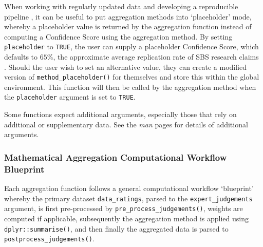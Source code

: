 \documentclass[article]{jss}
\begin{document}
\begin{tcolorbox}[enhanced jigsaw, arc=.35mm, bottomrule=.15mm, breakable, colback=white, colframe=quarto-callout-color-frame, left=2mm, leftrule=.75mm, opacityback=0, rightrule=.15mm, toprule=.15mm]
When working with regularly updated data and developing a reproducible
pipeline \citep{Yenni2019} , it can be useful to put aggregation methods
into `placeholder' mode, whereby a placeholder value is returned by the
aggregation function instead of computing a Confidence Score using the
aggregation method. By setting \texttt{placeholder} to \texttt{TRUE},
the user can supply a placeholder Confidence Score, which defaults to
\(65\%\), the approximate average replication rate of SBS research
claims \citep{Camerer2018}. Should the user wish to set an alternative
value, they can create a modified version of
\texttt{method\_placeholder()} for themselves and store this within the
global environment. This function will then be called by the aggregation
method when the \texttt{placeholder} argument is set to \texttt{TRUE}.

Some functions expect additional arguments, especially those that rely
on additional or supplementary data. See the \emph{man} pages for
details of additional arguments.

\subsubsection{Mathematical Aggregation Computational Workflow
Blueprint}\label{mathematical-aggregation-computational-workflow-blueprint}

Each aggregation function follows a general computational workflow
`blueprint' whereby the primary dataset \texttt{data\_ratings}, parsed
to the \texttt{expert\_judgements} argument, is first pre-processed by
\texttt{pre\_process\_judgements()}, weights are computed if applicable,
subsequently the aggregation method is applied using
\texttt{dplyr::summarise()}, and then finally the aggregated data is
parsed to \texttt{postprocess\_judgements()}.


\end{tcolorbox}
\end{document}
